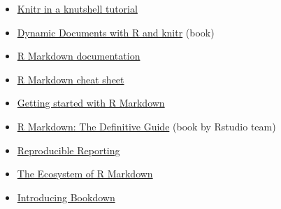 \documentclass[]{book}
\providecommand{\tightlist}{%
  \setlength{\itemsep}{0pt}\setlength{\parskip}{0pt}}
\begin{document}
\begin{itemize}
\tightlist
\item
  \href{http://kbroman.org/knitr_knutshell}{Knitr in a knutshell
  tutorial}
\item
  \href{http://www.amazon.com/exec/obidos/ASIN/1482203537/7210-20}{Dynamic
  Documents with R and knitr} (book)
\item
  \href{http://rmarkdown.rstudio.com}{R Markdown documentation}
\item
  \href{https://www.rstudio.com/wp-content/uploads/2016/03/rmarkdown-cheatsheet-2.0.pdf}{R
  Markdown cheat sheet}
\item
  \href{https://www.rstudio.com/resources/webinars/getting-started-with-r-markdown/}{Getting
  started with R Markdown}
\item
  \href{https://bookdown.org/yihui/rmarkdown/}{R Markdown: The
  Definitive Guide} (book by Rstudio team)
\item
  \href{https://www.rstudio.com/resources/webinars/reproducible-reporting/}{Reproducible
  Reporting}
\item
  \href{https://www.rstudio.com/resources/webinars/the-ecosystem-of-r-markdown/}{The
  Ecosystem of R Markdown}
\item
  \href{https://www.rstudio.com/resources/webinars/introducing-bookdown/}{Introducing
  Bookdown}
\end{itemize}


\end{document}

